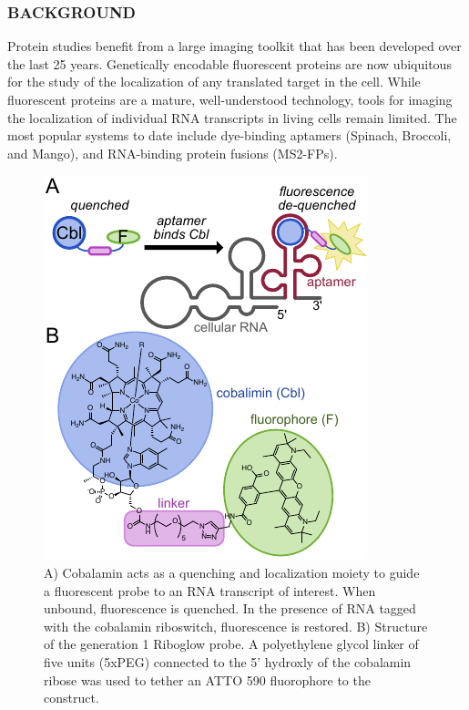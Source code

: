 \subsubsection*{BACKGROUND}
Protein studies benefit from a large imaging toolkit that has been developed over the last 25 years. Genetically encodable fluorescent proteins are now ubiquitous for the study of the localization of any translated target in the cell. While fluorescent proteins are a mature, well-understood technology, tools for imaging the localization of individual RNA transcripts in living cells remain limited. The most popular systems to date include dye-binding aptamers (Spinach\cite{PaigeRNAMimicsGreen2011}, Broccoli\cite{FilonovBroccoliRapidSelection2014}, and Mango\cite{AutourFluorogenicRNAMango2018,DolgosheinaRNAMangoAptamerFluorophore2014}), and RNA-binding protein fusions (MS2-FPs)\cite{FuscoSinglemRNAMolecules2003}.
\begin{figure}
\begin{centering}
\includegraphics[width=\textwidth]{figures/fig1v3.pdf}
\end{centering}
\footnotesize
\caption{\label{figure:riboglow}
A) Cobalamin acts as a quenching and localization moiety to guide a fluorescent probe to an RNA transcript of interest. When unbound, fluorescence is quenched. In the presence of RNA tagged with the cobalamin riboswitch, fluorescence is restored. B) Structure of the generation 1 Riboglow probe. A polyethylene glycol linker of five units (5xPEG) connected to the 5' hydroxly of the cobalamin ribose was used to tether an ATTO 590 fluorophore to the construct.
}
\end{figure}

